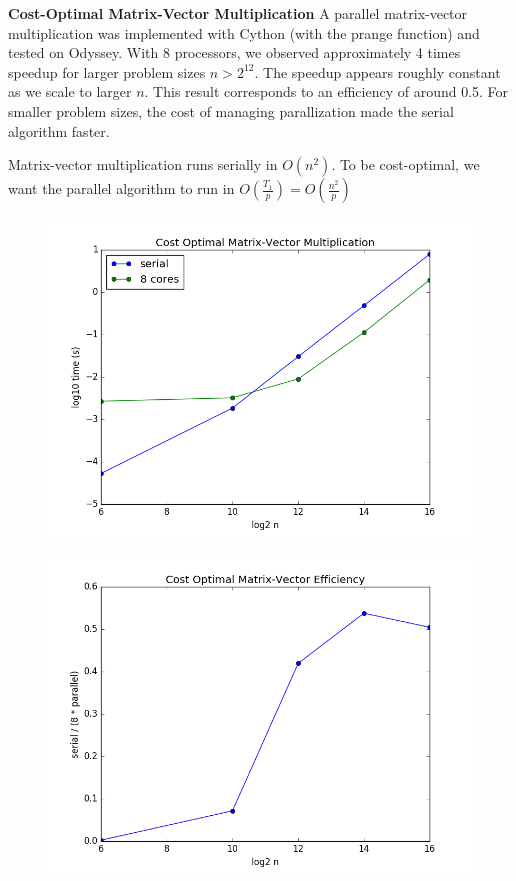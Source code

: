 \documentclass[11pt]{article}
\newcommand{\problem}{\FloatBarrier \medskip \noindent \textbf}
\begin{document}
\problem{Cost-Optimal Matrix-Vector Multiplication}
A parallel matrix-vector multiplication was implemented with Cython (with the prange function) and tested on Odyssey.
With 8 processors, we observed approximately 4 times speedup for larger problem sizes $n > 2^{12}$.
The speedup appears roughly constant as we scale to larger $n$.
This result corresponds to an efficiency of around 0.5.
For smaller problem sizes, the cost of managing parallization made the serial algorithm faster.

Matrix-vector multiplication runs serially in $O(n^2)$.
To be cost-optimal, we want the parallel algorithm to run in $O(\frac{T_1}{p}) = O(\frac{n^2}{p})$

\begin{figure}[h!]
\includegraphics[width=5in]{problem3mv.png}
\end{figure}

\begin{figure}[h!]
\includegraphics[width=5in]{problem3mveff.png}
\end{figure}
\end{document}
